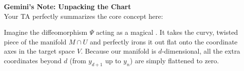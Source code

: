 \setcounter{section}{\value{savedSec}}
\setcounter{theorem}{\value{savedThm}}

\begin{extra}
\textbf{Gemini's Note: Unpacking the Chart}\\
Your TA perfectly summarizes the core concept here: \emph{} 

Imagine the diffeomorphism $\Psi$ acting as a magical . It takes the curvy, twisted piece of the manifold $M \cap U$ and perfectly irons it out flat onto the coordinate axes in the target space $V$. Because our manifold is $d$-dimensional, all the extra coordinates beyond $d$ (from $y_{d+1}$ up to $y_n$) are simply flattened to zero.
\end{extra}

